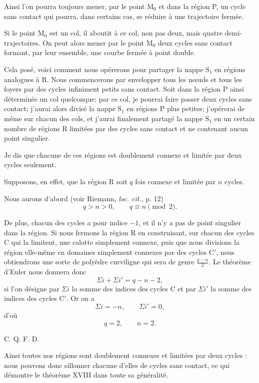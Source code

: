 \documentclass[11pt]{article}
\begin{document}
Ainsi l’on pourra toujours mener, par le point $\mathrm{M}_0$ et dans la région P, un cycle sans contact qui pourra, dans certains cas, se réduire à une trajectoire fermée.

Si le point $\mathrm{M}_0$ est un col, il aboutit à ce col, non pas deux, mais quatre demi-trajectoires. On peut alors mener par le point $\mathrm{M}_0$ deux cycles sans contact formant, par leur ensemble, une courbe fermée à point double.

Cela posé, voici comment nous opérerons pour partager la nappe $\mathrm{S}_1$ en régions analogues à R. Nous commencerons par envelopper tous les nœuds et tous les foyers par des cycles infiniment petits sans contact. Soit dans la région P ainsi déterminée un col quelconque; par ce col, je pourrai faire passer deux cycles sans contact; j’aurai alors divisé la nappe $\mathrm{S}_1$ en régions P plus petites; j’opérerai de même sur chacun des cols, et j’aurai finalement partagé la nappe $\mathrm{S}_1$ en un certain nombre de régions R limitées par des cycles sans contact et ne contenant aucun point singulier.

Je dis que chacune de ces régions est doublement connexe et limitée par deux cycles seulement.

Supposons, en effet, que la région R soit $q$ fois connexe et limitée par $n$ cycles.

Nous aurons d’abord (voir Riemann, \emph{loc. cit.}, p. 12)
\[
q>n>0,\qquad q\equiv n\pmod{2}.
\]

De plus, chacun des cycles a pour indice $-1$, et il n’y a pas de point singulier dans la région. Si nous fermons la région R en construisant, sur chacun des cycles C qui la limitent, une calotte simplement connexe, puis que nous divisions la région elle-même en domaines simplement connexes par des cycles C$'$, nous obtiendrons une sorte de polyèdre curviligne qui sera de genre $\frac{q-n}{2}$. Le théorème d’Euler nous donnera donc
\[
\Sigma i+\Sigma i'=q-n-2,
\]
si l’on désigne par $\Sigma i$ la somme des indices des cycles C et par $\Sigma i'$ la somme des indices des cycles C$'$. Or on a
\[
\Sigma i=-n,
\qquad
\Sigma i'=0,
\]
d’où
\[
q=2,\qquad n=2.
\]
\begin{flushright}C. Q. F. D.\end{flushright}

Ainsi toutes nos régions sont doublement connexes et limitées par deux cycles : nous pouvons donc sillonner chacune d’elles de cycles sans contact, ce qui démontre le théorème XVIII dans toute sa généralité.
\end{document}

